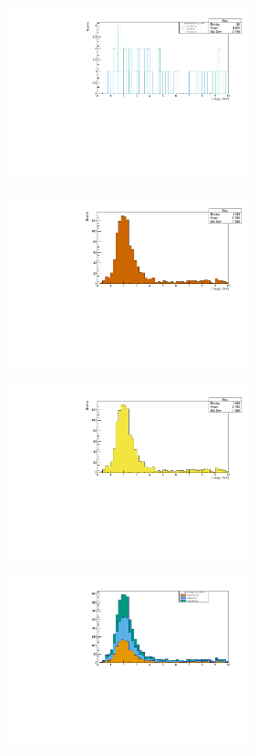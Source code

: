 \documentclass[12pt]{article}
\begin{document}
\newpage
\begin{figure}[h]
  \begin{subfigure}{0.49\textwidth}
   \centering
   \includegraphics[width=0.95\linewidth,height=5cm]{./figures/validgenie_nue_Enu_layered.pdf}
   \caption{}
   \label{}
  \end{subfigure}
  \begin{subfigure}{0.49\textwidth}
   \centering
   \includegraphics[width=0.95\linewidth,height=5cm]{./figures/validgenie~numu~Enu-Files~prod5p1-root.pdf}
   \caption{}
   \label{}
  \end{subfigure}
  \begin{subfigure}{0.49\textwidth}
   \centering
   \includegraphics[width=0.95\linewidth,height=5cm]{./figures/validgenie~numu~Enu-Files~valid-hist-root.pdf}
   \caption{}
   \label{}
  \end{subfigure}
  \begin{subfigure}{0.49\textwidth}
   \centering
   \includegraphics[width=0.95\linewidth,height=5cm]{./figures/validgenie_Enu_stacked.pdf}

\end{subfigure}
\end{figure}
\end{document}
